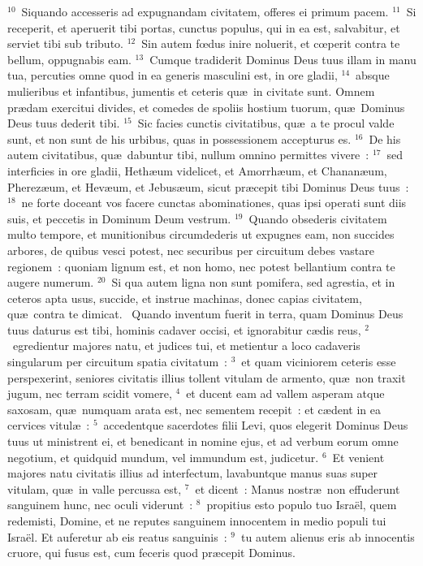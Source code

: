 ${}^{10}$~Siquando accesseris ad expugnandam civitatem, offeres ei primum pacem.
${}^{11}$~Si receperit, et aperuerit tibi portas, cunctus populus, qui in ea est, salvabitur, et serviet tibi sub tributo.
${}^{12}$~Sin autem fœdus inire noluerit, et cœperit contra te bellum, oppugnabis eam.
${}^{13}$~Cumque tradiderit Dominus Deus tuus illam in manu tua, percuties omne quod in ea generis masculini est, in ore gladii,
${}^{14}$~absque mulieribus et infantibus, jumentis et ceteris qu\ae\ in civitate sunt. Omnem pr\ae dam exercitui divides, et comedes de spoliis hostium tuorum, qu\ae\ Dominus Deus tuus dederit tibi.
${}^{15}$~Sic facies cunctis civitatibus, qu\ae\ a te procul valde sunt, et non sunt de his urbibus, quas in possessionem accepturus es.
${}^{16}$~De his autem civitatibus, qu\ae\ dabuntur tibi, nullum omnino permittes vivere~:
${}^{17}$~sed interficies in ore gladii, Heth\ae um videlicet, et Amorrh\ae um, et Chanan\ae um, Pherez\ae um, et Hev\ae um, et Jebus\ae um, sicut pr\ae cepit tibi Dominus Deus tuus~:
${}^{18}$~ne forte doceant vos facere cunctas abominationes, quas ipsi operati sunt diis suis, et peccetis in Dominum Deum vestrum.
${}^{19}$~Quando obsederis civitatem multo tempore, et munitionibus circumdederis ut expugnes eam, non succides arbores, de quibus vesci potest, nec securibus per circuitum debes vastare regionem~: quoniam lignum est, et non homo, nec potest bellantium contra te augere numerum.
${}^{20}$~Si qua autem ligna non sunt pomifera, sed agrestia, et in ceteros apta usus, succide, et instrue machinas, donec capias civitatem, qu\ae\ contra te dimicat.
~\lettrine[lines=10,image=true,loversize=0.05,lraise=-0.03]{Q}{}uando inventum fuerit in terra, quam Dominus Deus tuus daturus est tibi, hominis cadaver occisi, et ignorabitur c\ae dis reus,
${}^{2}$~egredientur majores natu, et judices tui, et metientur a loco cadaveris singularum per circuitum spatia civitatum~:
${}^{3}$~et quam viciniorem ceteris esse perspexerint, seniores civitatis illius tollent vitulam de armento, qu\ae\ non traxit jugum, nec terram scidit vomere,
${}^{4}$~et ducent eam ad vallem asperam atque saxosam, qu\ae\ numquam arata est, nec sementem recepit~: et c\ae dent in ea cervices vitul\ae~:
${}^{5}$~accedentque sacerdotes filii Levi, quos elegerit Dominus Deus tuus ut ministrent ei, et benedicant in nomine ejus, et ad verbum eorum omne negotium, et quidquid mundum, vel immundum est, judicetur.
${}^{6}$~Et venient majores natu civitatis illius ad interfectum, lavabuntque manus suas super vitulam, qu\ae\ in valle percussa est,
${}^{7}$~et dicent~: Manus nostr\ae\ non effuderunt sanguinem hunc, nec oculi viderunt~:
${}^{8}$~propitius esto populo tuo Isra\"el, quem redemisti, Domine, et ne reputes sanguinem innocentem in medio populi tui Isra\"el. Et auferetur ab eis reatus sanguinis~:
${}^{9}$~tu autem alienus eris ab innocentis cruore, qui fusus est, cum feceris quod pr\ae cepit Dominus.


